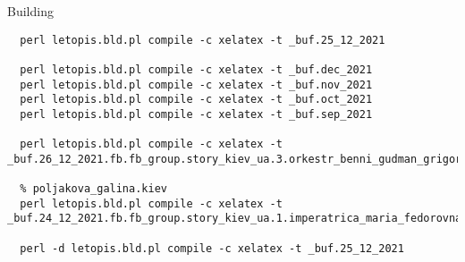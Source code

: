  
 
 
 
 
Building

\begin{verbatim}
  perl letopis.bld.pl compile -c xelatex -t _buf.25_12_2021

  perl letopis.bld.pl compile -c xelatex -t _buf.dec_2021
  perl letopis.bld.pl compile -c xelatex -t _buf.nov_2021
  perl letopis.bld.pl compile -c xelatex -t _buf.oct_2021
  perl letopis.bld.pl compile -c xelatex -t _buf.sep_2021

  perl letopis.bld.pl compile -c xelatex -t _buf.26_12_2021.fb.fb_group.story_kiev_ua.3.orkestr_benni_gudman_grigorij_chapkis_1962

  % poljakova_galina.kiev
  perl letopis.bld.pl compile -c xelatex -t _buf.24_12_2021.fb.fb_group.story_kiev_ua.1.imperatrica_maria_fedorovna

  perl -d letopis.bld.pl compile -c xelatex -t _buf.25_12_2021

\end{verbatim}
